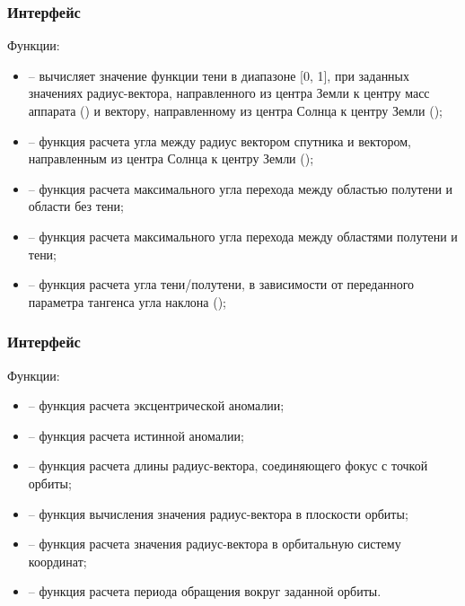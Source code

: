 \subsubsection{Интерфейс }
\noindent\indent Функции:
\begin{itemize}
    \item {} -- вычисляет значение
    функции тени в диапазоне [0, 1], при заданных значениях радиус-вектора, направленного
    из центра Земли к центру масс аппарата () и вектору, направленному из центра Солнца
    к центру Земли ();
    \item {} -- функция расчета угла между радиус вектором спутника
    и вектором, направленным из центра Солнца к центру Земли ();
    \item {} -- функция расчета максимального
    угла перехода между областью полутени и области без тени;
    \item {} -- функция расчета максимального
    угла перехода между областями полутени и тени;
    \item {} --
    функция расчета угла тени/полутени, в зависимости от переданного параметра
    тангенса угла наклона ();
\end{itemize}
\subsubsection{Интерфейс }
\noindent\indent Функции:
\begin{itemize}
    \item {} -- функция расчета эксцентрической аномалии;
    \item {} --
    функция расчета истинной аномалии;
    \item {} --
    функция расчета длины радиус-вектора, соединяющего фокус с точкой орбиты;
    \item {} -- функция вычисления значения радиус-вектора
    в плоскости орбиты;
    \item {} --
    функция расчета значения радиус-вектора в орбитальную систему координат;
    \item {} --
    функция расчета периода обращения вокруг заданной орбиты.
\end{itemize}
